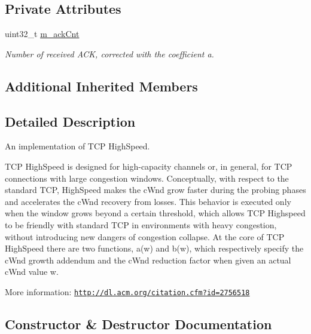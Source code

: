 \subsection*{Private Attributes}
\begin{DoxyCompactItemize}
\item 
uint32\+\_\+t \hyperlink{classns3_1_1TcpHighSpeed_aee2fcee158f034e4ec68a42a4564a2ec}{m\+\_\+ack\+Cnt}
\begin{DoxyCompactList}\small\item\em Number of received A\+CK, corrected with the coefficient a. \end{DoxyCompactList}\end{DoxyCompactItemize}
\subsection*{Additional Inherited Members}


\subsection{Detailed Description}
An implementation of T\+CP High\+Speed. 

T\+CP High\+Speed is designed for high-\/capacity channels or, in general, for T\+CP connections with large congestion windows. Conceptually, with respect to the standard T\+CP, High\+Speed makes the c\+Wnd grow faster during the probing phases and accelerates the c\+Wnd recovery from losses. This behavior is executed only when the window grows beyond a certain threshold, which allows T\+CP Highspeed to be friendly with standard T\+CP in environments with heavy congestion, without introducing new dangers of congestion collapse. At the core of T\+CP High\+Speed there are two functions, a(w) and b(w), which respectively specify the c\+Wnd growth addendum and the c\+Wnd reduction factor when given an actual c\+Wnd value w.

More information\+: \href{http://dl.acm.org/citation.cfm?id=2756518}{\tt http\+://dl.\+acm.\+org/citation.\+cfm?id=2756518} 

\subsection{Constructor \& Destructor Documentation}

